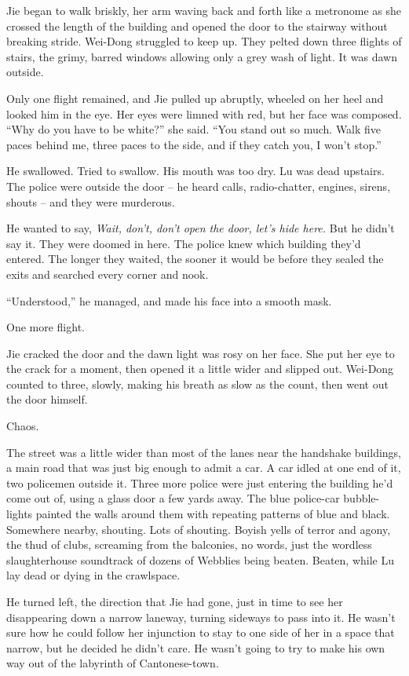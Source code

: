 Jie began to walk briskly, her arm waving back and forth like a
metronome as she crossed the length of the building and opened the
door to the stairway without breaking stride. Wei-Dong struggled to
keep up. They pelted down three flights of stairs, the grimy,
barred windows allowing only a grey wash of light. It was dawn
outside.

Only one flight remained, and Jie pulled up abruptly, wheeled on
her heel and looked him in the eye. Her eyes were limned with red,
but her face was composed. ``Why do you have to be white?'' she said.
``You stand out so much. Walk five paces behind me, three paces to
the side, and if they catch you, I won't stop.''

He swallowed. Tried to swallow. His mouth was too dry. Lu was dead
upstairs. The police were outside the door -- he heard calls,
radio-chatter, engines, sirens, shouts -- and they were murderous.

He wanted to say,
\emph{Wait, don't, don't open the door, let's hide here.} But he
didn't say it. They were doomed in here. The police knew which
building they'd entered. The longer they waited, the sooner it
would be before they sealed the exits and searched every corner and
nook.

``Understood,'' he managed, and made his face into a smooth mask.

One more flight.

Jie cracked the door and the dawn light was rosy on her face. She
put her eye to the crack for a moment, then opened it a little
wider and slipped out. Wei-Dong counted to three, slowly, making
his breath as slow as the count, then went out the door himself.

Chaos.

The street was a little wider than most of the lanes near the
handshake buildings, a main road that was just big enough to admit
a car. A car idled at one end of it, two policemen outside it.
Three more police were just entering the building he'd come out of,
using a glass door a few yards away. The blue police-car
bubble-lights painted the walls around them with repeating patterns
of blue and black. Somewhere nearby, shouting. Lots of shouting.
Boyish yells of terror and agony, the thud of clubs, screaming from
the balconies, no words, just the wordless slaughterhouse
soundtrack of dozens of Webblies being beaten. Beaten, while Lu lay
dead or dying in the crawlspace.

He turned left, the direction that Jie had gone, just in time to
see her disappearing down a narrow laneway, turning sideways to
pass into it. He wasn't sure how he could follow her injunction to
stay to one side of her in a space that narrow, but he decided he
didn't care. He wasn't going to try to make his own way out of the
labyrinth of Cantonese-town.

